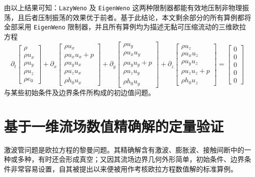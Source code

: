 \newpage{}

由以上结果可知：\texttt{LazyWeno} 及 \texttt{EigenWeno} 这两种限制器都能有效地压制非物理振荡，且后者压制振荡的效果优于前者。基于此结论，本文剩余部分的所有算例都将全部采用
\texttt{EigenWeno} 限制器，并且所有算例均为描述无黏可压缩流动的三维欧拉方程
\begin{equation}
\partial_{t}\begin{bmatrix}\rho\\
\rho u_{x}\\
\rho u_{y}\\
\rho u_{z}\\
\rho e_{0}
\end{bmatrix}+\partial_{x}\begin{bmatrix}\rho u_{x}\\
\rho u_{x}u_{x}+p\\
\rho u_{y}u_{x}\\
\rho u_{z}u_{x}\\
\rho h_{0}u_{x}
\end{bmatrix}+\partial_{y}\begin{bmatrix}\rho u_{y}\\
\rho u_{x}u_{y}\\
\rho u_{y}u_{y}+p\\
\rho u_{z}u_{y}\\
\rho h_{0}u_{y}
\end{bmatrix}+\partial_{z}\begin{bmatrix}\rho u_{z}\\
\rho u_{x}u_{z}\\
\rho u_{y}u_{z}\\
\rho u_{z}u_{z}+p\\
\rho h_{0}u_{z}
\end{bmatrix}=\begin{bmatrix}0\\
0\\
0\\
0\\
0
\end{bmatrix}\label{eq:euler_system}
\end{equation}
与某些初始条件及边界条件所构成的初边值问题。

\section{基于一维流场数值精确解的定量验证}

激波管问题是欧拉方程的黎曼问题。其精确解含有激波、膨胀波、接触间断中的一种或多种，有时还会形成真空；又因其流场边界几何外形简单，初始条件、边界条件非常容易设置，自其被提出以来便被用作考核欧拉方程数值解的标准算例。

